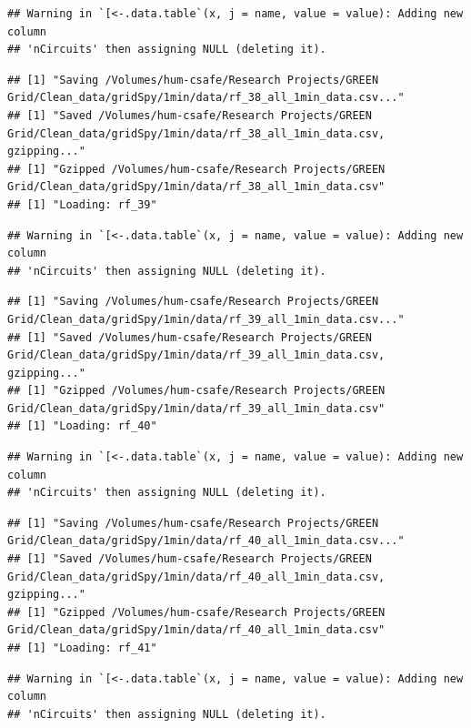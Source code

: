 \documentclass[]{article}
\begin{document}
\begin{verbatim}
## Warning in `[<-.data.table`(x, j = name, value = value): Adding new column
## 'nCircuits' then assigning NULL (deleting it).
\end{verbatim}

\begin{verbatim}
## [1] "Saving /Volumes/hum-csafe/Research Projects/GREEN Grid/Clean_data/gridSpy/1min/data/rf_38_all_1min_data.csv..."
## [1] "Saved /Volumes/hum-csafe/Research Projects/GREEN Grid/Clean_data/gridSpy/1min/data/rf_38_all_1min_data.csv, gzipping..."
## [1] "Gzipped /Volumes/hum-csafe/Research Projects/GREEN Grid/Clean_data/gridSpy/1min/data/rf_38_all_1min_data.csv"
## [1] "Loading: rf_39"
\end{verbatim}

\begin{verbatim}
## Warning in `[<-.data.table`(x, j = name, value = value): Adding new column
## 'nCircuits' then assigning NULL (deleting it).
\end{verbatim}

\begin{verbatim}
## [1] "Saving /Volumes/hum-csafe/Research Projects/GREEN Grid/Clean_data/gridSpy/1min/data/rf_39_all_1min_data.csv..."
## [1] "Saved /Volumes/hum-csafe/Research Projects/GREEN Grid/Clean_data/gridSpy/1min/data/rf_39_all_1min_data.csv, gzipping..."
## [1] "Gzipped /Volumes/hum-csafe/Research Projects/GREEN Grid/Clean_data/gridSpy/1min/data/rf_39_all_1min_data.csv"
## [1] "Loading: rf_40"
\end{verbatim}

\begin{verbatim}
## Warning in `[<-.data.table`(x, j = name, value = value): Adding new column
## 'nCircuits' then assigning NULL (deleting it).
\end{verbatim}

\begin{verbatim}
## [1] "Saving /Volumes/hum-csafe/Research Projects/GREEN Grid/Clean_data/gridSpy/1min/data/rf_40_all_1min_data.csv..."
## [1] "Saved /Volumes/hum-csafe/Research Projects/GREEN Grid/Clean_data/gridSpy/1min/data/rf_40_all_1min_data.csv, gzipping..."
## [1] "Gzipped /Volumes/hum-csafe/Research Projects/GREEN Grid/Clean_data/gridSpy/1min/data/rf_40_all_1min_data.csv"
## [1] "Loading: rf_41"
\end{verbatim}

\begin{verbatim}
## Warning in `[<-.data.table`(x, j = name, value = value): Adding new column
## 'nCircuits' then assigning NULL (deleting it).
\end{verbatim}
\end{document}
